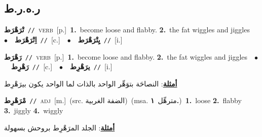 \documentclass[10pt,a4paper,twoside]{article} %
\begin{document}
\begin{multicols}{2}
\vspace{-3mm}
\subsection*{\color{blue}\foreignlanguage{arabic}{ر.ه.ر.ط}\color{blue}{}} 

{\setlength\topsep{0pt}\textbf{\foreignlanguage{arabic}{تْرَهْرَط}}\ {\color{gray}\texttt{//}\color{black}}\ \textsc{verb}\ [p.]\ \textbf{1.}~become loose and flabby.  \textbf{2.}~the fat wiggles and jiggles\ \ $\bullet$\ \ \setlength\topsep{0pt}\textbf{\foreignlanguage{arabic}{اِتْرَهْرَط}}\ {\color{gray}\texttt{//}\color{black}}\ [c.]\ \ $\bullet$\ \ \setlength\topsep{0pt}\textbf{\foreignlanguage{arabic}{يِتْرَهْرَط}}\ {\color{gray}\texttt{//}\color{black}}\ [i.]\ } \vspace{2mm}

{\setlength\topsep{0pt}\textbf{\foreignlanguage{arabic}{رَهْرَط}}\ {\color{gray}\texttt{//}\color{black}}\ \textsc{verb}\ [p.]\ \textbf{1.}~become loose and flabby.  \textbf{2.}~the fat wiggles and jiggles\ \ $\bullet$\ \ \setlength\topsep{0pt}\textbf{\foreignlanguage{arabic}{رَهْرِط}}\ {\color{gray}\texttt{//}\color{black}}\ [c.]\ \ $\bullet$\ \ \setlength\topsep{0pt}\textbf{\foreignlanguage{arabic}{يرَهْرِط}}\ {\color{gray}\texttt{//}\color{black}}\ [i.]\  \begin{flushright}\color{gray}\foreignlanguage{arabic}{\textbf{\underline{\foreignlanguage{arabic}{أمثلة}}}: النصاحَة بتوَهِّر الواحد بالذات لما الواحد يكون بيرَهْرِط}\end{flushright}\color{black}} \vspace{2mm}

{\setlength\topsep{0pt}\textbf{\foreignlanguage{arabic}{مْرَهْرِط}}\ {\color{gray}\texttt{//}\color{black}}\ \textsc{adj}\ [m.]\ (src. \color{gray}\foreignlanguage{arabic}{الضفة الغربية}\color{black})\ \color{gray}(msa. \foreignlanguage{arabic}{مترهِّل}~\foreignlanguage{arabic}{\textbf{١.}})\color{black}\ \textbf{1.}~loose  \textbf{2.}~flabby  \textbf{3.}~jiggly  \textbf{4.}~wiggly\  \begin{flushright}\color{gray}\foreignlanguage{arabic}{\textbf{\underline{\foreignlanguage{arabic}{أمثلة}}}: الجلد المرَهْرِط بروحش بسهولة}\end{flushright}\color{black}} \vspace{2mm}


\end{multicols}
\end{document}
